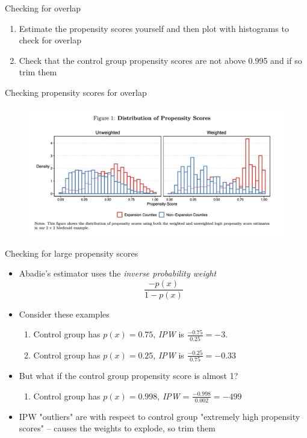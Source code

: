 \documentclass{beamer}
\begin{document}
\begin{frame}{Checking for overlap}

\begin{enumerate}
\item Estimate the propensity scores yourself and then plot with histograms to check for overlap
\item Check that the control group propensity scores are not above 0.995 and if so trim them
\end{enumerate}

\end{frame}

\begin{frame}{Checking propensity scores for overlap}

	\begin{figure}
	\includegraphics[scale=0.45]{./lecture_includes/baker_pscore.png}
	\end{figure}

\end{frame}

\begin{frame}{Checking for large propensity scores}

\begin{itemize}
\item Abadie's estimator uses the \emph{inverse probability weight} $$\frac{-p(x)}{1-p(x)}$$
\item Consider these examples
	\begin{enumerate}
	\item Control group has $p(x)=0.75$, \emph{IPW} is $\frac{-0.75}{0.25}=-3$. 
	\item Control group has $p(x)=0.25$, \emph{IPW} is $\frac{-0.25}{0.75}=-0.33$
	\end{enumerate}
\item But what if the control group propensity score is almost 1?
	\begin{enumerate}
	\item Control group has $p(x)=0.998$, \emph{IPW} = $\frac{-0.998}{0.002}=-499$
	\end{enumerate}
\item IPW "outliers" are with respect to control group "extremely high propensity scores" -- causes the weights to explode, so trim them
\end{itemize}

\end{frame}
\end{document}
